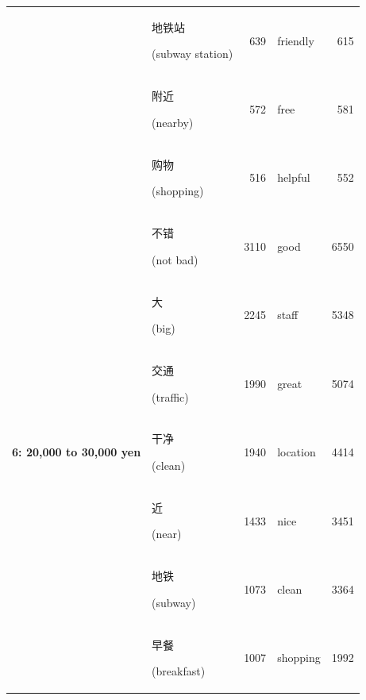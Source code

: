 \documentclass[smallextended,natbib]{svjour3}       %
\begin{document}
\begin{table}[ht]
{\begin{tabular}{|c|lr|lr|}
                                                             & \begin{CJK}{UTF8}{gbsn}地铁站\end{CJK} (subway station) & 639   & friendly    & 615   \\  
                                                             & \begin{CJK}{UTF8}{gbsn}附近\end{CJK} (nearby)          & 572   & free        & 581   \\  
                                                             & \begin{CJK}{UTF8}{gbsn}购物\end{CJK} (shopping)        & 516   & helpful     & 552   \\ \hline
        \multirow{10}{*}{\textbf{6: 20,000 to 30,000 yen}}   & \begin{CJK}{UTF8}{gbsn}不错\end{CJK} (not bad)         & 3110  & good        & 6550  \\  
                                                             & \begin{CJK}{UTF8}{gbsn}大\end{CJK} (big)              & 2245  & staff       & 5348  \\  
                                                             & \begin{CJK}{UTF8}{gbsn}交通\end{CJK} (traffic)         & 1990  & great       & 5074  \\  
                                                             & \begin{CJK}{UTF8}{gbsn}干净\end{CJK} (clean)           & 1940  & location    & 4414  \\  
                                                             & \begin{CJK}{UTF8}{gbsn}近\end{CJK} (near)             & 1433  & nice        & 3451  \\  
                                                             & \begin{CJK}{UTF8}{gbsn}地铁\end{CJK} (subway)          & 1073  & clean       & 3364  \\  
                                                             & \begin{CJK}{UTF8}{gbsn}早餐\end{CJK} (breakfast)       & 1007  & shopping    & 1992  \\  

\end{tabular}}
\end{table}
\end{document}
